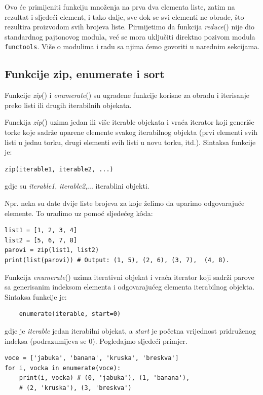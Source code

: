 Ovo će primijeniti funkciju množenja na prva dva elementa liste, zatim na rezultat i sljedeći element, i tako dalje, sve dok se svi elementi ne obrade, što rezultira proizvodom svih brojeva liste. Pirmijetimo da funkcija \textit{reduce}() nije dio standardnog pajtonovog modula, već se mora uključiti direktno pozivom modula \texttt{functools}. Više o modulima i radu sa njima ćemo govoriti u narednim sekcijama.



\subsection{Funkcije zip, enumerate i sort}
Funkcije  \textit{zip}() i \textit{enumerate}() su ugrađene funkcije korisne za obradu i iterisanje preko listi ili drugih iterabilnih objekata.

Funckija \textit{zip}() uzima jedan ili više iterable objekata i vraća iterator koji generiše torke koje sadrže uparene elemente svakog iterabilnog objekta (prvi elementi svih listi u jednu torku, drugi elementi svih listi u novu torku, itd.). Sintaksa funkcije je:
\begin{verbatim}
zip(iterable1, iterable2, ...)
\end{verbatim}
gdje su \emph{iterable1}, \emph{iterable2},... iterablini objekti. 

Npr. neka su date dvije liste brojeva za koje  želimo da uparimo odgova\-rajuće elemente. To uradimo uz pomoć sljedećeg k\^oda:
\begin{verbatim}
list1 = [1, 2, 3, 4]
list2 = [5, 6, 7, 8]
parovi = zip(list1, list2) 
print(list(parovi)) # Output: (1, 5), (2, 6), (3, 7),  (4, 8).
\end{verbatim}
Funkcija \textit{enumerate}() uzima iterativni objekat i vraća iterator koji sadrži parove sa generisanim indeksom elementa i odgovarajućeg elementa iterabilnog objekta. Sintaksa funkcije je:
\begin{verbatim}
	enumerate(iterable, start=0)
\end{verbatim}
gdje je \textit{iterable} jedan iterabilni objekat, a \textit{start} je početna vrijednost pridru\-ženog indeksa (podrazumijeva se 0). Pogledajmo sljedeći primjer. 

\begin{verbatim}
voce = ['jabuka', 'banana', 'kruska', 'breskva']
for i, vocka in enumerate(voce):
    print(i, vocka) # (0, 'jabuka'), (1, 'banana'),
    # (2, 'kruska'), (3, 'breskva')
\end{verbatim}


